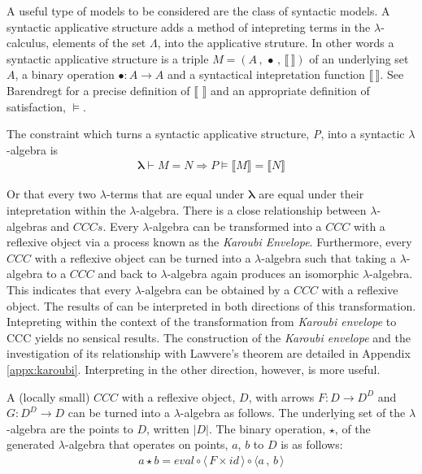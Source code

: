 A useful type of models to be considered are the class of syntactic models. A
syntactic applicative structure adds a method of intepreting terms in the
$\lambda$-calculus, elements of the set $\Lambda$, into the applicative
struture. In other words a syntactic applicative structure is a triple $M = (A
\, , \, \bullet \, , \, \llbracket \, \rrbracket)$ of an underlying set $A$, a
binary operation $\bullet : A \rightarrow A$ and a syntactical intepretation
function $\llbracket \, \rrbracket$. See Barendregt 
for a precise definition of $\llbracket \, \, \rrbracket$ and an appropriate definition of
satisfaction, $\vDash$.

The constraint which turns a syntactic applicative structure, \textit{P}, into a
syntactic $\lambda$-algebra is
\begin{align*}
    \bm{\lambda} \vdash M = N \Rightarrow P \models \llbracket M \rrbracket = \llbracket N
    \rrbracket
\end{align*}

Or that every two $\lambda$-terms that are equal under $\bm{\lambda}$ are equal
under their intepretation within the $\lambda$-algebra. There is a close
relationship between $\lambda$-algebras and $CCCs$. Every $\lambda$-algebra can
be transformed into a $CCC$ with a reflexive object via a process known as the
\textit{Karoubi Envelope}. Furthermore, every $CCC$ with a
reflexive object can be turned into a $\lambda$-algebra such that taking a
$\lambda$-algebra to a $CCC$ and back to $\lambda$-algebra again produces an
isomorphic $\lambda$-algebra. This indicates that every $\lambda$-algebra can be
obtained by a $CCC$ with a reflexive object. The results of  can be interpreted in both directions of this transformation.
Intepreting within the context of the transformation from \textit{Karoubi
envelope} to CCC yields no sensical results. The construction of the
\textit{Karoubi envelope} and the investigation of its relationship with
Lawvere's theorem are detailed in Appendix \ref{appx:karoubi}. Interpreting in
the other direction, however, is more useful.


A (locally small) $CCC$ with a reflexive object, $D$, with arrows $F : D
\rightarrow D^D$ and $G : D^D \rightarrow D$ can be turned into a
$\lambda$-algebra as follows. The underlying set of the $\lambda$-algebra are
the points to $D$, written $|D|$. The binary operation, $\star$, of the
generated $\lambda$-algebra that operates on points, $a$, $b$ to $D$ is as
follows:
\begin{align*}
    a \star b = eval \circ \langle \, F \times id \, \rangle \circ \langle a \,
    , \, b \,
    \rangle
\end{align*}

